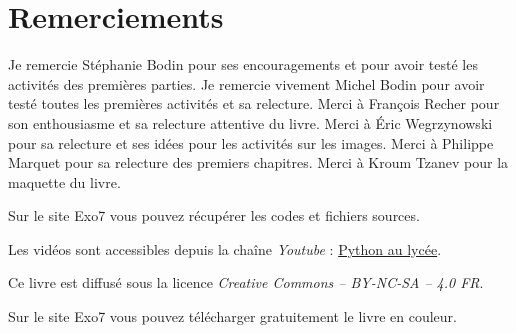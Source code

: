 
\clearemptydoublepage
\pagestyle{empty}\thispagestyle{empty}

\vspace*{\fill}

\section*{Remerciements}


Je remercie Stéphanie Bodin pour ses encouragements et pour avoir testé les activités des premières parties.
Je remercie vivement Michel Bodin pour avoir testé toutes les premières activités et sa relecture.
Merci à François Recher pour son enthousiasme et sa relecture attentive du livre. 
Merci à Éric Wegrzynowski pour sa relecture et ses idées pour les activités sur les images. 
Merci à Philippe Marquet pour sa relecture des premiers chapitres. Merci à Kroum Tzanev pour la maquette du livre.


\bigskip

\begin{center}
Sur le site Exo7 vous pouvez récupérer les codes et fichiers sources.


Les vidéos sont accessibles depuis la chaîne \emph{Youtube} :
\href{https://www.youtube.com/channel/UC6PiFyqBiUjiJ7Q3DRSW2Wg}{\og{}Python au lycée\fg{}}.
\end{center}


\vspace*{\fill}

\bigskip 

\begin{center}
\end{center}



\begin{center}
Ce livre est diffusé sous la licence \emph{Creative Commons -- BY-NC-SA -- 4.0 FR}.

Sur le site Exo7 vous pouvez télécharger gratuitement le livre en couleur.
\end{center}




\printindex
{}

